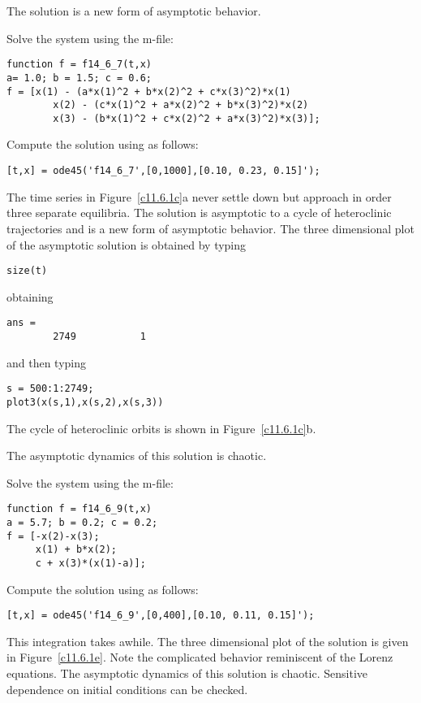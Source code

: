\documentclass{ximera}
\begin{document}
 \ans The solution is a new form of asymptotic behavior.

\soln Solve the system  using the m-file:
\begin{verbatim}
function f = f14_6_7(t,x)
a= 1.0; b = 1.5; c = 0.6;
f = [x(1) - (a*x(1)^2 + b*x(2)^2 + c*x(3)^2)*x(1) 
        x(2) - (c*x(1)^2 + a*x(2)^2 + b*x(3)^2)*x(2)
        x(3) - (b*x(1)^2 + c*x(2)^2 + a*x(3)^2)*x(3)];
\end{verbatim}
Compute the solution using \Matlab as follows:
\begin{verbatim}
[t,x] = ode45('f14_6_7',[0,1000],[0.10, 0.23, 0.15]');
\end{verbatim}

The time series in Figure~\ref{c11.6.1c}a never settle down but approach in 
order three separate
equilibria.  The solution is asymptotic to a cycle of heteroclinic
trajectories and is a new form of asymptotic behavior.  The three 
dimensional plot of the asymptotic solution is obtained by typing
\begin{verbatim}
size(t)
\end{verbatim}
obtaining
\begin{verbatim}
ans =
        2749           1
\end{verbatim}
and then typing
\begin{verbatim}
s = 500:1:2749;
plot3(x(s,1),x(s,2),x(s,3))
\end{verbatim}
The cycle of heteroclinic orbits is shown in Figure~\ref{c11.6.1c}b.

\begin{figure}[htb]
     \centerline{%
     }
\end{figure}


\newpage
{}  \ans The asymptotic dynamics of this solution is chaotic.

\soln Solve the system using the m-file:
\begin{verbatim}
function f = f14_6_9(t,x)
a = 5.7; b = 0.2; c = 0.2;
f = [-x(2)-x(3); 
     x(1) + b*x(2); 
     c + x(3)*(x(1)-a)];
\end{verbatim}

Compute the solution using \Matlab as follows:
\begin{verbatim}
[t,x] = ode45('f14_6_9',[0,400],[0.10, 0.11, 0.15]');
\end{verbatim}
This integration takes awhile.  The three dimensional plot of the
solution is given in Figure~\ref{c11.6.1e}.  Note the complicated behavior
reminiscent of the Lorenz equations.  The asymptotic dynamics of this
solution is chaotic.  Sensitive dependence on initial conditions can be
checked.
\end{document}
